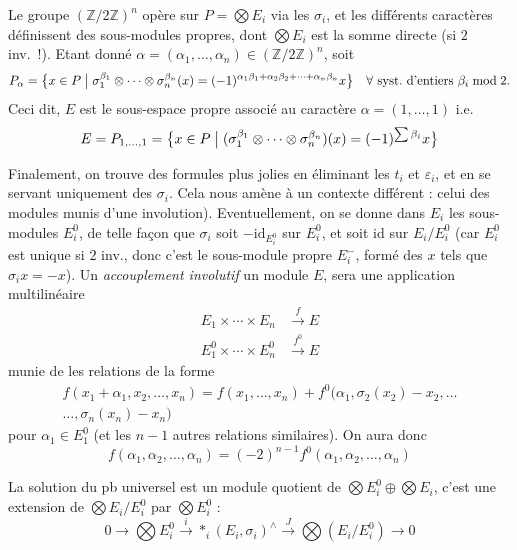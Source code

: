 \documentclass[11pt,a4paper]{article}
\begin{document}
Le groupe $(\mathbb{Z}/2\mathbb{Z})^n$ opère sur $P = \bigotimes E_i$ via les $\sigma_i$, et les différents caractères définissent des sous-modules propres, dont $\bigotimes E_i$ est la somme directe (si $2$ inv.\ !). Etant donné $\alpha = (\alpha_1, \ldots, \alpha_n) \in (\mathbb{Z}/2\mathbb{Z})^n$, soit
\[
  P_\alpha = \bigl\{ x \in P \bigm| \sigma_1^{\beta_1} \otimes \cdots \otimes \sigma_n^{\beta_n}(x) = (-1)^{\alpha_1\beta_1 + \alpha_2\beta_2 + \cdots + \alpha_n\beta_n} x \bigr\}
  \quad \forall \text{ syst.\ d'entiers } \beta_i \bmod 2 .
\]
Ceci dit, $E$ est le sous-espace propre associé au caractère $\alpha = (1, \ldots, 1)$ i.e.
\[
  E = P_{1, \ldots, 1} = \bigl\{ x \in P \bigm| (\sigma_1^{\beta_1} \otimes \cdots \otimes \sigma_n^{\beta_n})(x) = (-1)^{\sum \beta_i} x \bigr\}
\]

Finalement, on trouve des formules plus jolies en éliminant les $t_i$ et $\varepsilon_i$, et en se servant uniquement des $\sigma_i$. Cela nous amène à un contexte différent : celui des  modules munis d'une involution). Eventuellement, on se donne dans $E_i$ les sous-modules $E_i^0$, de telle façon que $\sigma_i$ soit $-\mathrm{id}_{E_i^0}$ sur $E_i^0$, et soit id sur $E_i/E_i^0$ (car $E_i^0$ est \struck{\ill{}} unique si $2$ inv., donc c'est le sous-module propre $E_i^-$, formé des $x$ tels que $\sigma_i x = -x$). Un \emph{accouplement involutif}   un module $E$, sera une application multilinéaire
\[
  \begin{aligned}
    E_1 \times \cdots \times E_n &\xrightarrow{\ f\ } E \\
    E_1^0 \times \cdots \times E_n^0 &\xrightarrow{\ f^0\ } E
  \end{aligned}
\]
munie de \struck{\ill{}}  les relations de la forme
\[
  \begin{aligned}
    f(x_1 + \alpha_1, x_2, \ldots, x_n) = f(x_1, \ldots, x_n) + f^0(\alpha_1, \sigma_2(x_2) - x_2, \ldots \\
    \ldots, \sigma_n(x_n) - x_n)
  \end{aligned}
\]
pour $\alpha_1 \in E_1^0$ (et les $n - 1$ autres relations similaires). On aura donc
\[
  f(\alpha_1, \alpha_2, \ldots, \alpha_n) = (-2)^{n-1} f^0(\alpha_1, \alpha_2, \ldots, \alpha_n)
\]

La solution du pb  universel est un module \struck{\ill{}}  quotient de $\bigotimes E_i^0 \oplus \bigotimes E_i$, c'est une extension de $\bigotimes E_i/E_i^0$ par $\bigotimes E_i^0$ :
\[
  0 \longrightarrow \bigotimes E_i^0 \xrightarrow{\ i\ } \mathop{\ast}_i (E_i, \sigma_i)^{\wedge} \xrightarrow{\ J\ } \bigotimes (E_i/E_i^0) \longrightarrow 0
\]
\end{document}
